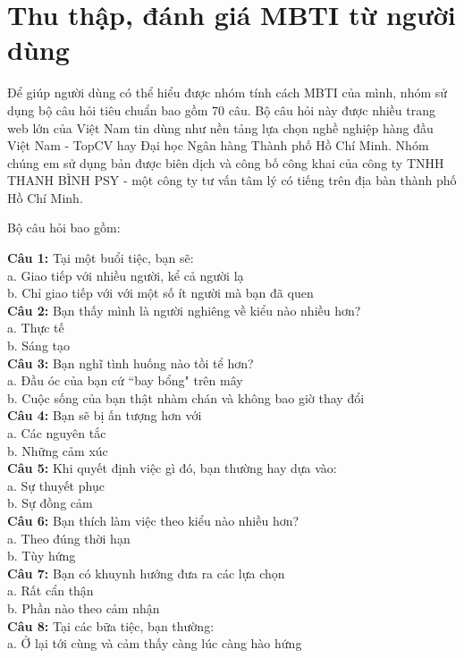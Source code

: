 \section{Thu thập, đánh giá MBTI từ người dùng}
Để giúp người dùng có thể hiểu được nhóm tính cách MBTI của mình, nhóm sử dụng bộ câu hỏi tiêu chuẩn bao gồm 70 câu. Bộ câu hỏi này được nhiều trang web lớn của Việt Nam tin dùng như nền tảng lựa chọn nghề nghiệp hàng đầu Việt Nam - TopCV hay Đại học Ngân hàng Thành phố Hồ Chí Minh. Nhóm chúng em sử dụng bản được biên dịch và công bố công khai của công ty TNHH THANH BÌNH PSY - một công ty tư vấn tâm lý có tiếng trên địa bàn thành phố Hồ Chí Minh.

Bộ câu hỏi bao gồm:
\begin{multicols}{2}
\noindent \textbf{Câu 1:} Tại một buổi tiệc, bạn sẽ: \\
a. Giao tiếp với nhiều người, kể cả người lạ \\
b. Chỉ giao tiếp với với một số ít người mà bạn đã quen \\
\textbf{Câu 2:} Bạn thấy mình là người nghiêng về kiểu nào nhiều hơn? \\
a. Thực tế \\
b. Sáng tạo \\
\textbf{Câu 3:} Bạn nghĩ tình huống nào tồi tể hơn? \\
a. Đầu óc của bạn cứ “bay bổng" trên mây \\
b. Cuộc sống của bạn thật nhàm chán và không bao giờ thay đổi \\
\textbf{Câu 4:} Bạn sẽ bị ấn tượng hơn với \\
a. Các nguyên tắc \\
b. Những cảm xúc \\
\textbf{Câu 5:} Khi quyết định việc gì đó, bạn thường hay dựa vào: \\
a. Sự thuyết phục \\
b. Sự đồng cảm \\
\textbf{Câu 6:} Bạn thích làm việc theo kiểu nào nhiều hơn? \\
a. Theo đúng thời hạn \\
b. Tùy hứng \\
\textbf{Câu 7:} Bạn có khuynh hướng đưa ra các lựa chọn \\
a. Rất cẩn thận \\
b. Phần nào theo cảm nhận \\
\textbf{Câu 8:} Tại các bữa tiệc, bạn thường: \\
a. Ở lại tới cùng và cảm thấy càng lúc càng hào hứng \\

\end{multicols}
